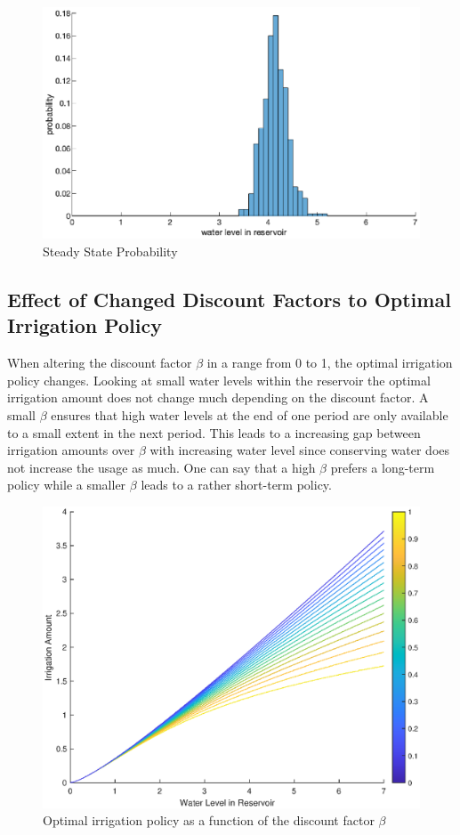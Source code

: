\documentclass[12pt, a4paper, oneside]{article}
\begin{document}
\begin{figure}[ht]
	\includegraphics[width=1\textwidth]{figures/steadyStateMonteCarlo.eps}
	\caption{Steady State Probability}
	\label{fig:steadyStateMonteCarlo}
\end{figure}
\subsection{Effect of Changed Discount Factors to Optimal Irrigation Policy}
When altering the discount factor $\beta$ in a range from 0 to 1, the optimal irrigation policy changes.
Looking at small water levels within the reservoir the optimal irrigation amount does not change much depending on the discount factor.
A small $\beta$ ensures that high water levels at the end of one period are only available to a small extent in the next period. 
This leads to a increasing gap between irrigation amounts over $\beta$ with increasing water level since conserving water does not increase the usage as much.
One can say that a high $\beta$ prefers a long-term policy while a smaller $\beta$ leads to a rather short-term policy.
\begin{figure}[ht]
	\includegraphics[width=1\textwidth]{figures/optimum-policy-over-beta.eps}
	\caption{Optimal irrigation policy as a function of the discount factor $\beta$}
	\label{fig:optimal-irrigation-beta}
\end{figure}
\newpage
\end{document}
